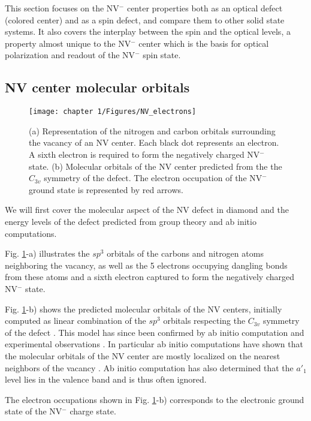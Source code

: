 \documentclass[a4paper, 11pt]{report}
\begin{document}
This section focuses on the NV$^-$ center properties both as an optical defect (colored center) and as a spin defect, and compare them to other solid state systems. It also covers the interplay between the spin and the optical levels, a property almost unique to the NV$^-$ center which is the basis for optical polarization and readout of the NV$^-$ spin state.

\subsection{NV center molecular orbitals}

\begin{figure}[h!]
\centering
\texttt{[image: chapter 1/Figures/NV\_electrons]}
\caption{(a) Representation of the nitrogen and carbon orbitals surrounding the vacancy of an NV center. Each black dot represents an electron. A sixth electron is required to form the negatively charged NV$^-$ state. (b) Molecular orbitals of the NV center predicted from the the $C_{3v}$ symmetry of the defect. The electron occupation of the NV$^-$ ground state is represented by red arrows.}
\label{NV electrons}
\end{figure}

We will first cover the molecular aspect of the NV defect in diamond and the energy levels of the defect predicted from group theory and ab initio computations.

Fig. \ref{NV electrons}-a) illustrates the $sp^3$ orbitals of the carbons and nitrogen atoms neighboring the vacancy, as well as the 5 electrons occupying dangling bonds from these atoms and a sixth electron captured to form the negatively charged NV$^-$ state. 

Fig. \ref{NV electrons}-b) shows the predicted molecular orbitals of the NV centers, initially computed as linear combination of the $sp^3$ orbitals respecting the $C_{3v}$ symmetry of the defect \citep{loubser1978electron}. This model has since been confirmed by ab initio computation and experimental observations \citep{doherty2013nitrogen}. In particular ab initio computations have shown that the molecular orbitals of the NV center are mostly localized on the nearest neighbors of the vacancy \citep{gali2008ab}. Ab initio computation has also determined that the $a'_1$ level lies in the valence band and is thus often ignored.

The electron occupations shown in Fig. \ref{NV electrons}-b) corresponds to the electronic ground state of the NV$^-$ charge state.
\end{document}
